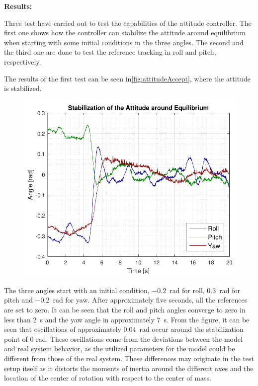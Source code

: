 \textbf{Results:}

Three test have carried out to test the capabilities of the attitude controller. The first one shows how the controller can stabilize the attitude around equilibrium when starting with some initial conditions in the three angles. The second and the third one are done to test the reference tracking in roll and pitch, respectively.

The results of the first test can be seen in\autoref{fig:attitudeAccept}, where the attitude is stabilized.
\begin{figure}[H]
	\includegraphics[scale=.7]{figures/attitudeAccept.pdf}
	\centering			
	\label{fig:attitudeAccept}
\end{figure} 
%
The three angles start with an initial condition, \SI{-0.2}{rad} for roll, \SI{0.3}{rad} for pitch and \SI{-0.2}{rad} for yaw. After approximately five seconds, all the references are set to zero. It can be seen that the roll and pitch angles converge to zero in less than \SI{2}{s} and the yaw angle in approximately \SI{7}{s}. From the figure, it can be seen that oscillations of approximately \SI{0.04}{rad} occur around the stabilization point of 0 rad. These oscillations come from the deviations between the model and real system behavior, as the utilized parameters for the model could be different from those of the real system. These differences may originate in the test setup itself as it distorts the moments of inertia around the different axes and the location of the center of rotation with respect to the center of mass. %

